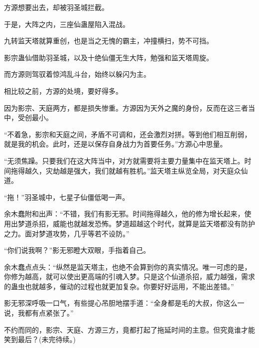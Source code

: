 \begin{this_body}
方源想要出去，却被羽圣城拦截。

于是，大阵之内，三座仙蛊屋陷入混战。

九转监天塔就算重创，也是当之无愧的霸主，冲撞横扫，势不可挡。

影宗蛊仙借助羽圣城，以及十绝仙僵无生大阵，勉强和监天塔周旋。

而方源则驾驭着惊鸿乱斗台，始终以躲闪为主。

相比较之前，方源的处境，要好得多。

因为影宗、天庭两方，都是损失惨重。方源因为天外之魔的身份，反而在这三者当中，受创最小。

“不着急，影宗和天庭之间，矛盾不可调和，还会激烈对拼。等到他们相互削弱，就是我的机会。此时，还是以保存自身战力为首要任务。”方源心中思量。

“无须焦躁。只要我们在这大阵当中，对方就需要将主要力量集中在监天塔上。时间拖得越久，灾劫越是强大，我们就越有胜机。”监天塔主纵览全局，对天庭众仙道。

“拖！”羽圣城中，七星子仙僵低喝一声。

余木蠢附和出声：“不错，我们有影无邪。时间拖得越久，他的修为增长起来，使用出梦道杀招，威能也就越发恐怖。梦道超越这个时代，就算是监天塔都没有防护之力。面对梦道攻势，几乎等若不设防。”

“你们说我啊？”影无邪瞪大双眼，手指着自己。

余木蠢点点头：“纵然是监天塔主，也绝不会算到你的真实情况。唯一可虑的是，你修为越高，就可以使出更高端的引魂入梦。只是这个仙道杀招，威力越强，需求的蛊虫也就越多，催动的过程也就更加复杂。你要好好运用，不能出差错。”

影无邪深呼吸一口气，有些提心吊胆地摆手道：“全身都是毛的大叔，你这么一说，我都有点紧张了。”

不约而同的，影宗、天庭、方源三方，竟都打起了拖延时间的主意。但究竟谁才能笑到最后？(未完待续。)

\end{this_body}

